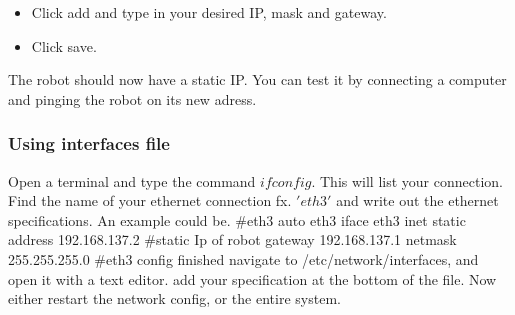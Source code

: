 \documentclass{article}
\begin{document}
\begin{itemize}
\begin{center}
\end{center}
\item Click add and type in your desired IP, mask and gateway. 
\begin{center}
\end{center}
\item Click save. 
\end{itemize}
The robot should now have a static IP. You can test it by connecting a computer and pinging the robot on its new adress. 

\subsubsection{Using interfaces file}
Open a terminal and type the command $ifconfig$. 
This will list your connection. Find the name of your ethernet connection fx. $'eth3'$ and write out the ethernet specifications. An example could be. 
\#eth3
auto eth3 
iface eth3 inet static 
address 192.168.137.2 \#static Ip of robot
gateway 192.168.137.1 
netmask 255.255.255.0  
\#eth3 config finished
navigate to /etc/network/interfaces, and open it with a text editor. 
add your specification at the bottom of the file.
Now either restart the network config, or the entire system.
\end{document}
